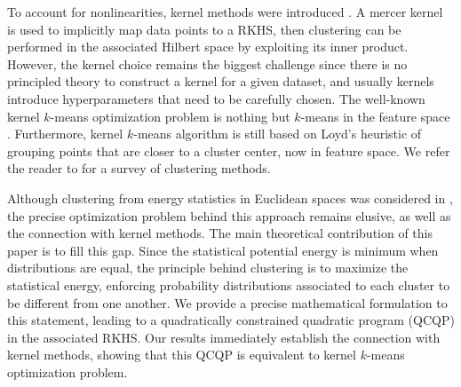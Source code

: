 \documentclass[twoside]{article}
\begin{document}
To account for nonlinearities, kernel methods were introduced 
\citep{Smola,Girolami}. A mercer kernel \citep{Mercer} is used to implicitly
map data points to a RKHS, then clustering can be performed in the associated
Hilbert space by exploiting its inner product. However, the kernel choice remains 
the biggest challenge since there is no principled theory to construct a kernel
for a given dataset, and usually kernels introduce hyperparameters that 
need to be carefully chosen.
The well-known kernel $k$-means optimization problem is nothing but $k$-means 
in the feature space \citep{Girolami}. Furthermore, kernel $k$-means algorithm
\citep{Dhillon2,Dhillon} is still based on Loyd's heuristic \citep{Lloyd}
of grouping points that are closer to a cluster center, now
in feature space. 
We refer the reader to \citep{Filippone} for a survey of clustering
methods.

Although clustering from energy statistics in Euclidean spaces was considered
in \citep{Kgroups}, the precise optimization problem behind this approach
remains elusive, as well as the connection with kernel methods.
The main theoretical contribution of this paper is to fill this gap.
Since the statistical potential energy is minimum when
distributions are equal, the principle behind clustering is to maximize 
the statistical energy,  enforcing probability distributions associated to 
each cluster to be different from one another. We provide a precise 
mathematical formulation to this statement, leading to a quadratically 
constrained quadratic program (QCQP) in the associated RKHS. Our results
immediately establish the connection with kernel methods, showing that this 
QCQP is equivalent to kernel $k$-means optimization problem. 
\end{document}
